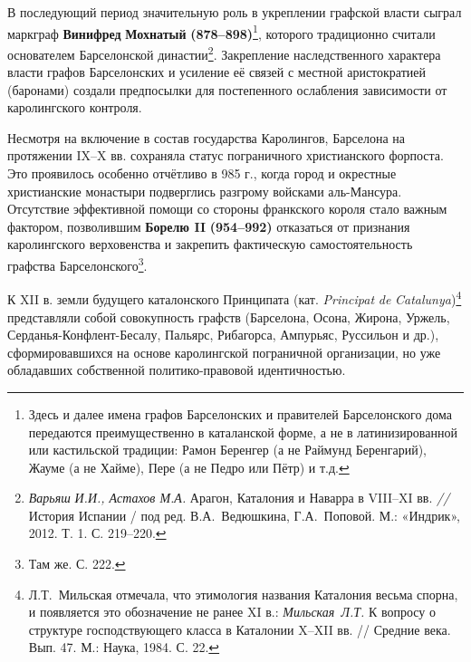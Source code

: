 В последующий период значительную роль в укреплении графской власти сыграл маркграф \textbf{Винифред}\textbf{ Мохнатый} \textbf{(878--898)}\footnote{Здесь и далее имена графов Барселонских и правителей Барселонского дома передаются преимущественно в каталанской форме, а не в латинизированной или кастильской традиции: Рамон Беренгер (а не Раймунд Беренгарий), Жауме (а не Хайме), Пере (а не Педро или Пётр) и т.д.}, которого традиционно считали основателем Барселонской династии\footnote{\emph{Варьяш}\emph{ И.И., Астахов М.А.} Арагон, Каталония и Наварра в VIII--XI вв. \emph{// }История Испании / под ред. В.А.~Ведюшкина, Г.А.~Поповой. М.: «Индрик», 2012. Т. 1. С. 219--220.}. Закрепление наследственного характера власти графов Барселонских и усиление её связей с местной аристократией (баронами) создали предпосылки для постепенного ослабления зависимости от каролингского контроля.

Несмотря на включение в состав государства Каролингов, Барселона на протяжении IX--X вв. сохраняла статус пограничного христианского форпоста. Это проявилось особенно отчётливо в 985 г., когда город и окрестные христианские монастыри подверглись разгрому войсками аль-Мансура. Отсутствие эффективной помощи со стороны франкского короля стало важным фактором, позволившим \textbf{Борелю II}\textbf{ }\textbf{(954--992) }отказаться от признания каролингского верховенства и закрепить фактическую самостоятельность графства Барселонского\footnote{Там же. С. 222.}.

К XII в. земли будущего каталонского Принципата (кат. \emph{Principat}\emph{ de }\emph{Catalunya})\footnote{Л.Т.~Мильская отмечала, что этимология названия Каталония весьма спорна, и появляется это обозначение не ранее XI в.: \emph{Мильская}\emph{~}\emph{Л.Т.} К вопросу о структуре господствующего класса в Каталонии X--XII вв. // Средние века. Вып. 47. М.: Наука, 1984. С. 22.} представляли собой совокупность графств (Барселона, Осона, Жирона, Уржель, Серданья-Конфлент-Бесалу, Пальярс, Рибагорса, Ампурьяс, Руссильон и др.), сформировавшихся на основе каролингской пограничной организации, но уже обладавших собственной политико-правовой идентичностью.

